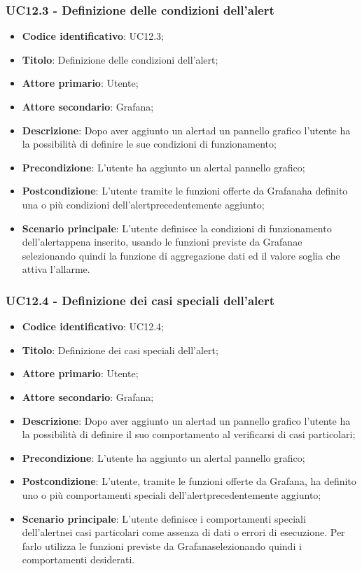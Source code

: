 \subsubsection{UC12.3 - Definizione delle condizioni dell'alert}
\begin{itemize}
	\item \textbf{Codice identificativo}: UC12.3;
	\item \textbf{Titolo}: Definizione delle condizioni dell'alert\glo;
	\item \textbf{Attore primario}: Utente;
	\item \textbf{Attore secondario}: Grafana\glo;
	\item \textbf{Descrizione}: Dopo aver aggiunto un alert\glosp ad un pannello grafico l'utente ha la possibilità di definire le sue condizioni di funzionamento;
	\item \textbf{Precondizione}: L'utente ha aggiunto un alert\glosp al pannello grafico;
	\item \textbf{Postcondizione}: L'utente tramite le funzioni offerte da Grafana\glosp ha definito una o più condizioni dell'alert\glosp precedentemente aggiunto;
	\item \textbf{Scenario principale}: L'utente definisce la condizioni di funzionamento dell'alert\glosp appena inserito, usando le funzioni previste da Grafana\glosp e selezionando quindi la funzione di aggregazione dati ed il valore soglia che attiva l'allarme.
\end{itemize}

\subsubsection{UC12.4 - Definizione dei casi speciali dell'alert}
	\begin{itemize}
	\item \textbf{Codice identificativo}: UC12.4;
	\item \textbf{Titolo}: Definizione dei casi speciali dell'alert\glo;
	\item \textbf{Attore primario}: Utente;
	\item \textbf{Attore secondario}: Grafana\glo;
	\item \textbf{Descrizione}: Dopo aver aggiunto un alert\glosp ad un pannello grafico l'utente ha la possibilità di definire il suo comportamento al verificarsi di casi particolari;
	\item \textbf{Precondizione}: L'utente ha aggiunto un alert\glosp al pannello grafico;
	\item \textbf{Postcondizione}: L'utente, tramite le funzioni offerte da Grafana\glosp, ha definito uno o più comportamenti speciali dell'alert\glosp precedentemente aggiunto;
	\item \textbf{Scenario principale}: L'utente definisce i comportamenti speciali dell'alert\glosp nei casi particolari come assenza di dati o errori di esecuzione. Per farlo utilizza le funzioni previste da Grafana\glosp selezionando quindi i comportamenti desiderati.
\end{itemize} 
